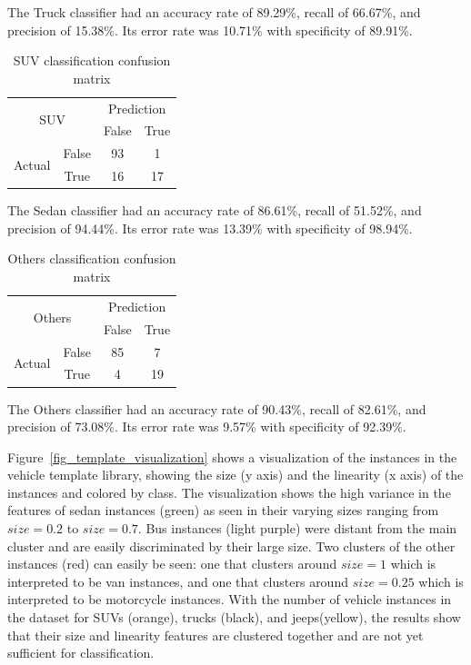 \documentclass[conference]{IEEEtran}
\begin{document}
The Truck classifier had an accuracy rate of 89.29\%, recall of 66.67\%, and precision of 15.38\%. Its error rate was 10.71\% with specificity of 89.91\%. 

\begin{table}[]
\centering
\caption{SUV classification confusion matrix}
\label{cm:suv}
\begin{tabular}{|c|c|c|c|}
\hline
\multicolumn{2}{|c|}{\multirow{2}{*}{SUV}} & \multicolumn{2}{c|}{Prediction} \\ \cline{3-4} 
\multicolumn{2}{|c|}{}                       & False          & True           \\ \hline
\multirow{2}{*}{Actual}         & False      & 93             &  1              \\ \cline{2-4} 
                                & True       & 16             & 17             \\ \hline
\end{tabular}
\end{table}

The Sedan classifier had an accuracy rate of 86.61\%, recall of 51.52\%, and precision of 94.44\%. Its error rate was 13.39\% with specificity of 98.94\%. 

\begin{table}[]
\centering
\caption{Others classification confusion matrix}
\label{cm:others}
\begin{tabular}{|c|c|c|c|}
\hline
\multicolumn{2}{|c|}{\multirow{2}{*}{Others}} & \multicolumn{2}{c|}{Prediction} \\ \cline{3-4} 
\multicolumn{2}{|c|}{}                       & False          & True           \\ \hline
\multirow{2}{*}{Actual}         & False      & 85             &  7              \\ \cline{2-4} 
                                & True       &  4             & 19             \\ \hline
\end{tabular}
\end{table}

The Others classifier had an accuracy rate of 90.43\%, recall of 82.61\%, and precision of 73.08\%. Its error rate was 9.57\% with specificity of 92.39\%. 


Figure~\ref{fig_template_visualization} shows a visualization of the instances in the vehicle template library, showing the size (y axis) and the linearity (x axis) of the instances and colored by class. The visualization shows the high variance in the features of sedan instances (green) as seen in their varying sizes ranging from $size = 0.2$ to $size = 0.7$. Bus instances (light purple) were distant from the main cluster and are easily discriminated by their large size. Two clusters of the other instances (red) can easily be seen: one that clusters around $size = 1$ which is interpreted to be van instances, and one that clusters around $size = 0.25$ which is interpreted to be motorcycle instances. With the number of vehicle instances in the dataset for SUVs (orange), trucks (black), and jeeps(yellow), the results show that their size and linearity features are clustered together and are not yet sufficient for classification.
\end{document}
